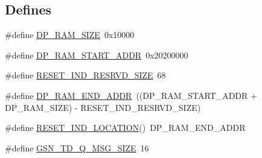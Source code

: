 \subsection*{Defines}
\begin{DoxyCompactItemize}
\item 
\#define \hyperlink{a00504_a44b95fe3f9838b63d4282a6a413a0420}{DP\_\-RAM\_\-SIZE}~0x10000
\item 
\#define \hyperlink{a00504_aec37f3e3a39dc1b34124eb3910354072}{DP\_\-RAM\_\-START\_\-ADDR}~0x20200000
\item 
\#define \hyperlink{a00504_ab962077fafe0d5c7cf939b161ee036cd}{RESET\_\-IND\_\-RESRVD\_\-SIZE}~68
\item 
\#define \hyperlink{a00504_ac44fe8ec6bb4d56cb75f549c72337159}{DP\_\-RAM\_\-END\_\-ADDR}~((DP\_\-RAM\_\-START\_\-ADDR + DP\_\-RAM\_\-SIZE) -\/ RESET\_\-IND\_\-RESRVD\_\-SIZE)
\item 
\#define \hyperlink{a00504_a6f1967f211946fb8b058b6f7f2a2e320}{RESET\_\-IND\_\-LOCATION}()~DP\_\-RAM\_\-END\_\-ADDR
\item 
\#define \hyperlink{a00504_a65fc079f82225f881f51d99d69997df7}{GSN\_\-TD\_\-Q\_\-MSG\_\-SIZE}~16
\end{DoxyCompactItemize}
